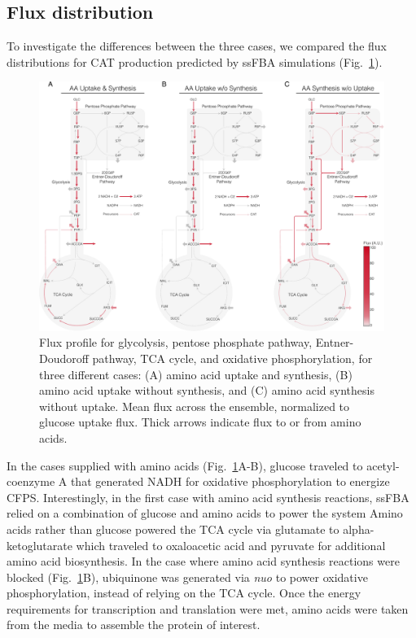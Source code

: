 \documentclass[journal=asbcd6,manuscript=article]{achemso}
\begin{document}
\subsection{Flux distribution}
To investigate the differences between the three cases, we compared the flux distributions for CAT production predicted by ssFBA simulations (Fig.~\ref{fig:flux}).
\begin{figure}[t!]
\includegraphics[width=1.00\textwidth]{./figs/Fig-5-FluxDistribition-Optimal.pdf}
\caption{Flux profile for glycolysis, pentose phosphate pathway, Entner-Doudoroff pathway, TCA cycle, and oxidative phosphorylation, for three different cases: (A) amino acid uptake and synthesis, (B) amino acid uptake without synthesis, and (C) amino acid synthesis without uptake. Mean flux across the ensemble, normalized to glucose uptake flux. Thick arrows indicate flux to or from amino acids.}
\label{fig:flux}
\end{figure}
In the cases supplied with amino acids (Fig.~\ref{fig:flux}A-B), glucose traveled to acetyl-coenzyme A that generated NADH for oxidative phosphorylation to energize CFPS.
Interestingly, in the first case with amino acid synthesis reactions, ssFBA relied on a combination of glucose and amino acids to power the system
Amino acids rather than glucose powered the TCA cycle via glutamate to alpha-ketoglutarate which traveled to oxaloacetic acid and pyruvate for additional amino acid biosynthesis.
In the case where amino acid synthesis reactions were blocked (Fig.~\ref{fig:flux}B), ubiquinone was generated via \textit{nuo} to power oxidative phosphorylation, instead of relying on the TCA cycle.
Once the energy requirements for transcription and translation were met, amino acids were taken from the media to assemble the protein of interest.
\end{document}
